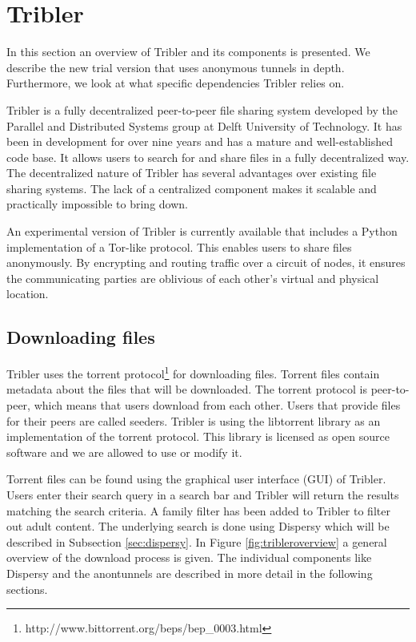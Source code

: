 
\section{Tribler}
	\label{sec:tribler}
	In this section an overview of Tribler and its components is presented. We describe the new trial version that uses anonymous tunnels in depth. Furthermore, we look at what specific dependencies Tribler relies on.

	Tribler is a fully decentralized peer-to-peer file sharing system developed by the Parallel and Distributed Systems group at Delft University of Technology. It has been in development for over nine years and has a mature and well-established code base. It allows users to search for and share files in a fully decentralized way. The decentralized nature of Tribler has several advantages over existing file sharing systems. The lack of a centralized component makes it scalable and practically impossible to bring down. 

	An experimental version of Tribler is currently available that includes a Python implementation of a Tor-like protocol. This enables users to share files anonymously. By encrypting and routing traffic over a circuit of nodes, it ensures the communicating parties are oblivious of each other's virtual and physical location.
	
	\subsection{Downloading files}
		Tribler uses the torrent protocol\footnote{http://www.bittorrent.org/beps/bep\_0003.html} for downloading files. Torrent files contain metadata about the files that will be downloaded. The torrent protocol is peer-to-peer, which means that users download from each other. Users that provide files for their peers are called seeders. Tribler is using the libtorrent library as an implementation of the torrent protocol. This library is licensed as open source software and we are allowed to use or modify it.
		
		Torrent files can be found using the graphical user interface (GUI) of Tribler. Users enter their search query in a search bar and Tribler will return the results matching the search criteria. A family filter has been added to Tribler to filter out adult content. The underlying search is done using Dispersy which will be described in Subsection \ref{sec:dispersy}. In Figure \ref{fig:tribleroverview} a general overview of the download process is given. The individual components like Dispersy and the anontunnels are described in more detail in the following sections.
		
